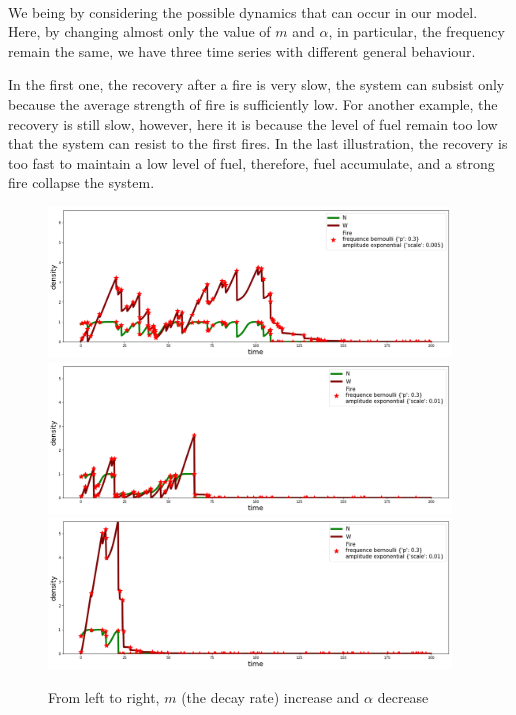 \documentclass{article}
\begin{document}
\paragraph{}
We being by considering the possible dynamics that can occur in our model. Here, by changing almost only the value of $m$ and $\alpha$, in particular, the frequency remain the same, we have three time series with different general behaviour.

In the first one, the recovery after a fire is very slow, the system can subsist only because the average strength of fire is sufficiently low. For another example, the recovery is still slow, however, here it is because the level of fuel remain too low that the system can resist to the first fires. In the last illustration, the recovery is too fast to maintain a low level of fuel, therefore, fuel accumulate, and a strong fire collapse the system.


\begin{figure}[h!]
\begin{center}
\includegraphics[height = 4cm]{results/time_series_case_linear_2.png}
\includegraphics[height = 4cm]{results/time_series_case_counter_2.png}
\includegraphics[height = 4cm]{results/time_series_case_clock_2.png}
\end{center}
\caption{\label{fig:temp}From left to right, $m$ (the decay rate) increase and $\alpha$ decrease}
\end{figure}
\end{document}
